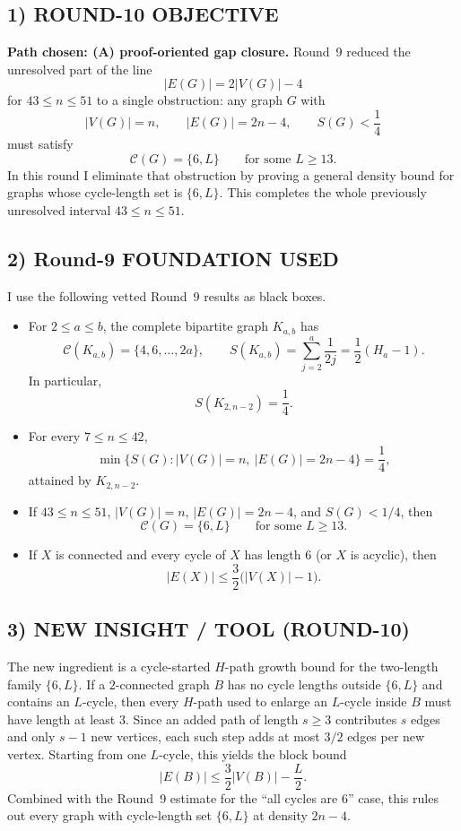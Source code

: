 \subsection*{1) ROUND-10 OBJECTIVE}

\textbf{Path chosen: (A) proof-oriented gap closure.}
Round~9 reduced the unresolved part of the line
\[
|E(G)|=2|V(G)|-4
\]
for $43\le n\le 51$ to a single obstruction: any graph $G$ with
\[
|V(G)|=n,\qquad |E(G)|=2n-4,\qquad S(G)<\frac14
\]
must satisfy
\[
\mathcal C(G)=\{6,L\}
\qquad\text{for some }L\ge 13.
\]
In this round I eliminate that obstruction by proving a general density bound for graphs whose cycle-length set is $\{6,L\}$. This completes the whole previously unresolved interval $43\le n\le 51$.

\subsection*{2) Round-9 FOUNDATION USED}

I use the following vetted Round~9 results as black boxes.
\begin{itemize}
\item[(F1)] For $2\le a\le b$, the complete bipartite graph $K_{a,b}$ has
\[
\mathcal C(K_{a,b})=\{4,6,\dots,2a\},
\qquad
S(K_{a,b})=\sum_{j=2}^{a}\frac1{2j}=\frac12(H_a-1).
\]
In particular,
\[
S(K_{2,n-2})=\frac14.
\]

\item[(F2)] For every $7\le n\le 42$,
\[
\min\{S(G): |V(G)|=n,\ |E(G)|=2n-4\}=\frac14,
\]
attained by $K_{2,n-2}$.

\item[(F3)] If $43\le n\le 51$, $|V(G)|=n$, $|E(G)|=2n-4$, and $S(G)<1/4$, then
\[
\mathcal C(G)=\{6,L\}
\qquad\text{for some }L\ge 13.
\]

\item[(F4)] If $X$ is connected and every cycle of $X$ has length $6$ (or $X$ is acyclic), then
\[
|E(X)|\le \frac32\bigl(|V(X)|-1\bigr).
\]
\end{itemize}

\subsection*{3) NEW INSIGHT / TOOL (ROUND-10)}

The new ingredient is a cycle-started $H$-path growth bound for the two-length family $\{6,L\}$.
If a $2$-connected graph $B$ has no cycle lengths outside $\{6,L\}$ and contains an $L$-cycle, then every $H$-path used to enlarge an $L$-cycle inside $B$ must have length at least $3$.
Since an added path of length $s\ge 3$ contributes $s$ edges and only $s-1$ new vertices, each such step adds at most $3/2$ edges per new vertex. Starting from one $L$-cycle, this yields the block bound
\[
|E(B)|\le \frac32|V(B)|-\frac L2.
\]
Combined with the Round~9 estimate for the ``all cycles are $6$'' case, this rules out every graph with cycle-length set $\{6,L\}$ at density $2n-4$.

